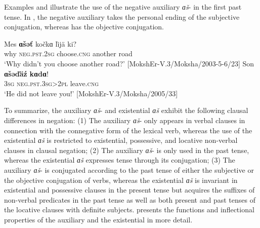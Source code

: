 \documentclass[output=paper,colorlinks,citecolor=brown,draft,draftmode]{langscibook}
\begin{document}
  Examples  and  illustrate the use of the negative auxiliary \textit{ɑš}- in the first past tense. In , the negative auxiliary takes the personal ending of the subjective conjugation, whereas  has the objective conjugation.

\ea\label{ex:moksha-road}
\gll Mes \textbf{ɑšəť} kočkɑ ľijä ki?\\
why \textsc{neg.pst.2sg} choose.\textsc{cng} another road\\
\glt `Why didn't you choose another road?' [MokshEr-V.3/Moksha/2003-5-6/23]
\z
\ea\label{ex:moksha-leave}
\gll Son \textbf{ɑšəďäź} \textbf{kɑdɑ}!\\
\textsc{3sg} \textsc{neg.pst.3sg>2pl} leave.\textsc{cng}\\
\glt `He did not leave you!' [MokshEr-V.3/Moksha/2005/33]
\z

  To summarize, the auxiliary \textit{ɑš}- and existential \textit{ɑš} exhibit the following clausal differences in negation: (1) The auxiliary \textit{ɑš}- only appears in verbal clauses in connection with the connegative form of the lexical verb, whereas the use of the existential \textit{ɑš} is restricted to existential, possessive, and locative non-verbal clauses in clausal negation; (2) The auxiliary \textit{ɑš}- is only used in the past tense, whereas the existential \textit{ɑš} expresses tense through its conjugation; (3) The auxiliary \textit{ɑš}- is conjugated according to the past tense of either the subjective or the objective conjugation of verbs, whereas the existential \textit{ɑš} is invariant in existential and possessive clauses in the present tense but acquires the suffixes of non-verbal predicates in the past tense as well as both present and past tenses of the locative clauses with definite subjects.  presents the functions and inflectional properties of the auxiliary and the existential in more detail.
\end{document}
